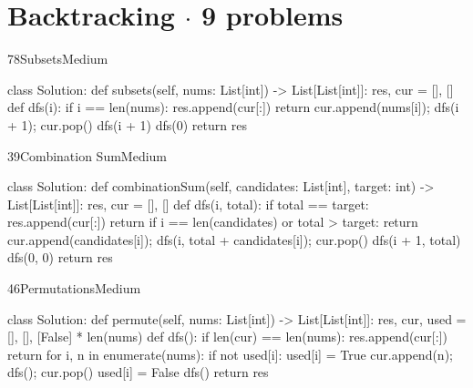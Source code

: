 \section{Backtracking \texorpdfstring{{\normalsize\color{muted}$\cdot$ 9 problems}}{- 9 problems}}

\begin{problem}{78}{Subsets}{Medium}
\begin{code}
class Solution:
    def subsets(self, nums: List[int]) -> List[List[int]]:
        res, cur = [], []
        def dfs(i):
            if i == len(nums):
                res.append(cur[:])
                return
            cur.append(nums[i]); dfs(i + 1); cur.pop()
            dfs(i + 1)
        dfs(0)
        return res
\end{code}
\end{problem}

\begin{problem}{39}{Combination Sum}{Medium}
\begin{code}
class Solution:
    def combinationSum(self, candidates: List[int], target: int) -> List[List[int]]:
        res, cur = [], []
        def dfs(i, total):
            if total == target:
                res.append(cur[:])
                return
            if i == len(candidates) or total > target:
                return
            cur.append(candidates[i]); dfs(i, total + candidates[i]); cur.pop()
            dfs(i + 1, total)
        dfs(0, 0)
        return res
\end{code}
\end{problem}

\begin{problem}{46}{Permutations}{Medium}
\begin{code}
class Solution:
    def permute(self, nums: List[int]) -> List[List[int]]:
        res, cur, used = [], [], [False] * len(nums)
        def dfs():
            if len(cur) == len(nums):
                res.append(cur[:])
                return
            for i, n in enumerate(nums):
                if not used[i]:
                    used[i] = True
                    cur.append(n); dfs(); cur.pop()
                    used[i] = False
        dfs()
        return res
\end{code}
\end{problem}

